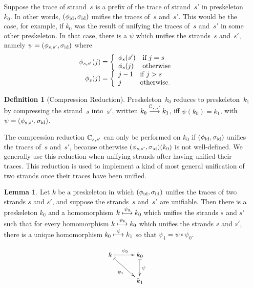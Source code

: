 \documentclass[12pt]{article}
\theoremstyle{definition}
\newtheorem{defn}{Definition}[section]
\newtheorem{lem}[thm]{Lemma}
\begin{document}
Suppose the trace of strand~$s$ is a prefix of the trace of
strand~$s'$ in preskeleton~$k_0$.  In other words, $(\phi_{\mathrm{id}},\sigma_{\mathrm{id}})$
unifies the traces of~$s$ and~$s'$.  This would be the case, for example,
if $k_0$ was the result of unifying the traces of~$s$ and~$s'$ in some
other preskeleton.
In that case, there is a
$\psi$ which unifies the strands~$s$ and~$s'$, namely
$\psi=(\phi_{s,s'},\sigma_{\mathrm{id}})$ where
$$\begin{array}{r@{}c@{}l}
\phi_{s,s'}(j)&{}={}&\left\{
\begin{array}{ll}
\phi_s(s')&\mbox{if $j=s$}\\
\phi_s(j)&\mbox{otherwise}
\end{array}\right.\\
\phi_s(j)&{}={}&\left\{
\begin{array}{ll}
j-1&\mbox{if $j>s$}\\
j&\mbox{otherwise.}
\end{array}\right.
\end{array}
$$

\begin{defn}[Compression Reduction]
Preskeleton~$k_0$ reduces to preskeleton~$k_1$ by compressing the
strand~$s$ into~$s'$, written $k_0\stackrel{\mathbb C_{s,s'}}{\longrightarrow}k_1$,
iff $\psi(k_0)=k_1$, with $\psi=(\phi_{s,s'},\sigma_{\mathrm{id}})$.
\end{defn}

The compression reduction $\mathbb C_{s,s'}$ can only be performed on
$k_0$ if $(\phi_{\mathrm{id}},\sigma_{\mathrm{id}})$ unifies the traces of~$s$ and~$s'$, because
otherwise $(\phi_{s,s'},\sigma_{\mathrm{id}})(k_0)$ is not well-defined.  We generally
use this reduction when unifying strands after having unified their
traces.  This reduction is used to implement a kind of most general
unification of two strands once their traces have been unified.

\begin{lem}\label{lem:compression}
Let $k$ be a preskeleton in which $(\phi_{\mathrm{id}},\sigma_{\mathrm{id}})$ unifies the traces
of two strands $s$ and $s'$, and suppose
the strands~$s$ and~$s'$ are unifiable.  Then
there is a preskeleton $k_0$ and a homomorphism $k\stackrel{\psi_0}{\longmapsto}k_0$
which unifies the strands $s$ and $s'$ such that for every
homomorphism $k\stackrel{\psi_0}{\longmapsto}k_0$ which unifies the
strands $s$ and $s'$, there is a unique homomorphism
$k_0\stackrel{\psi}{\longmapsto}k_1$ so that $\psi_1=\psi\circ\psi_0$.

$$\xymatrix@C=3em{
k\ar@{|->}[r]^{\psi_0} \ar@{|->}[rd]_{\psi_1} &
k_0 \ar@{|->}[d]^{\psi}\\
&k_1}$$
\end{lem}
\end{document}
